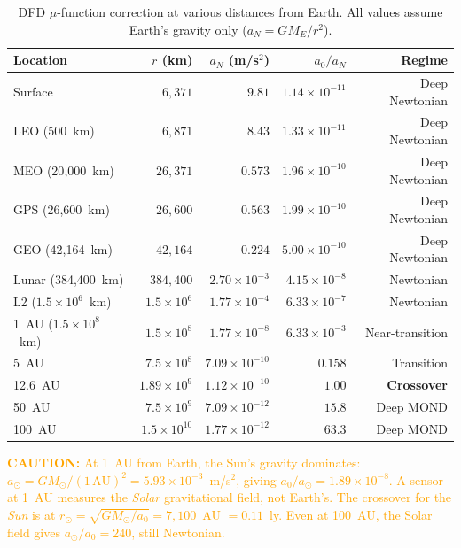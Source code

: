 \documentclass[11pt]{article}
\theoremstyle{definition}
\theoremstyle{remark}
\newcommand{\ee}[1]{\times10^{#1}}
\newcommand{\azero}{a_0}
\newcommand{\caution}[1]{\textcolor{orange}{\textbf{CAUTION:} #1}}
\begin{document}
\begin{table}[H]
\centering
\small
\caption{DFD $\mu$-function correction at various distances from Earth.
All values assume Earth's gravity only ($a_N = GM_E / r^2$).}
\label{tab:sensitivity-ladder}
\begin{tabular}{@{}lrrrr@{}}
\toprule
Location & $r$ (km) & $a_N$ (m/s$^2$) & $\azero / a_N$ & Regime \\
\midrule
Surface & $6{,}371$ & $9.81$ & $1.14\ee{-11}$ & Deep Newtonian \\
LEO (500~km) & $6{,}871$ & $8.43$ & $1.33\ee{-11}$ & Deep Newtonian \\
MEO (20{,}000~km) & $26{,}371$ & $0.573$ & $1.96\ee{-10}$ & Deep Newtonian \\
GPS (26{,}600~km) & $26{,}600$ & $0.563$ & $1.99\ee{-10}$ & Deep Newtonian \\
GEO (42{,}164~km) & $42{,}164$ & $0.224$ & $5.00\ee{-10}$ & Deep Newtonian \\
Lunar (384{,}400~km) & $384{,}400$ & $2.70\ee{-3}$ & $4.15\ee{-8}$ & Newtonian \\
L2 ($1.5\ee{6}$~km) & $1.5\ee{6}$ & $1.77\ee{-4}$ & $6.33\ee{-7}$ & Newtonian \\
1~AU ($1.5\ee{8}$~km) & $1.5\ee{8}$ & $1.77\ee{-8}$ & $6.33\ee{-3}$ & Near-transition \\
5~AU & $7.5\ee{8}$ & $7.09\ee{-10}$ & $0.158$ & Transition \\
12.6~AU & $1.89\ee{9}$ & $1.12\ee{-10}$ & $1.00$ & \textbf{Crossover} \\
50~AU & $7.5\ee{9}$ & $7.09\ee{-12}$ & $15.8$ & Deep MOND \\
100~AU & $1.5\ee{10}$ & $1.77\ee{-12}$ & $63.3$ & Deep MOND \\
\bottomrule
\end{tabular}
\end{table}

\caution{At 1~AU from Earth, the Sun's gravity dominates:
$a_\odot = GM_\odot / (1\,\mathrm{AU})^2 = 5.93\ee{-3}$~m/s$^2$,
giving $\azero / a_\odot = 1.89\ee{-8}$. A sensor at 1~AU measures
the \emph{Solar} gravitational field, not Earth's. The crossover
for the \emph{Sun} is at $r_\odot = \sqrt{GM_\odot / \azero}
= 7{,}100$~AU $= 0.11$~ly. Even at 100~AU, the Solar field gives
$a_\odot / \azero = 240$, still Newtonian.}
\end{document}
